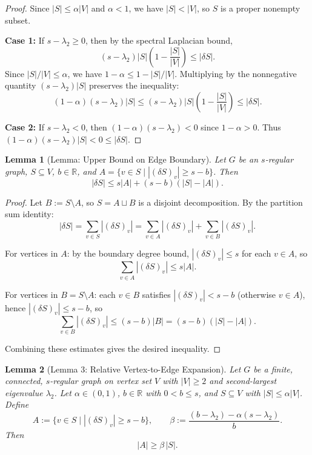\documentclass[11pt]{article}
\theoremstyle{plain}
\newtheorem*{lemma}{Lemma}
\theoremstyle{definition}
\theoremstyle{remark}
\begin{document}
\begin{proof}
Since $|S| \leq \alpha|V|$ and $\alpha < 1$, we have $|S| < |V|$, so $S$ is a proper nonempty subset.

\textbf{Case 1:} If $s - \lambda_2 \geq 0$, then by the spectral Laplacian bound,
\[
(s - \lambda_2)|S|\left(1 - \frac{|S|}{|V|}\right) \leq |\delta S|.
\]
Since $|S|/|V| \leq \alpha$, we have $1 - \alpha \leq 1 - |S|/|V|$. Multiplying by the nonnegative quantity $(s-\lambda_2)|S|$ preserves the inequality:
\[
(1-\alpha)(s-\lambda_2)|S| \leq (s-\lambda_2)|S|\left(1-\frac{|S|}{|V|}\right) \leq |\delta S|.
\]

\textbf{Case 2:} If $s - \lambda_2 < 0$, then $(1-\alpha)(s-\lambda_2) < 0$ since $1-\alpha > 0$. Thus $(1-\alpha)(s-\lambda_2)|S| < 0 \leq |\delta S|$.
\end{proof}

\begin{lemma}[Lemma: Upper Bound on Edge Boundary]
Let $G$ be an $s$-regular graph, $S \subseteq V$, $b \in \mathbb{R}$, and $A = \{v \in S \mid |(\delta S)_v| \geq s - b\}$. Then
\[
|\delta S| \leq s|A| + (s - b)(|S| - |A|).
\]
\end{lemma}

\begin{proof}
Let $B := S \setminus A$, so $S = A \sqcup B$ is a disjoint decomposition. By the partition sum identity:
\[
|\delta S| = \sum_{v \in S} |(\delta S)_v| = \sum_{v \in A} |(\delta S)_v| + \sum_{v \in B} |(\delta S)_v|.
\]

For vertices in $A$: by the boundary degree bound, $|(\delta S)_v| \leq s$ for each $v \in A$, so
\[
\sum_{v \in A} |(\delta S)_v| \leq s|A|.
\]

For vertices in $B = S \setminus A$: each $v \in B$ satisfies $|(\delta S)_v| < s - b$ (otherwise $v \in A$), hence $|(\delta S)_v| \leq s - b$, so
\[
\sum_{v \in B} |(\delta S)_v| \leq (s-b)|B| = (s-b)(|S| - |A|).
\]

Combining these estimates gives the desired inequality.
\end{proof}

\begin{lemma}[Lemma 3: Relative Vertex-to-Edge Expansion]
Let $G$ be a finite, connected, $s$-regular graph on vertex set $V$ with $|V| \geq 2$ and second-largest eigenvalue $\lambda_2$. Let $\alpha \in (0,1)$, $b \in \mathbb{R}$ with $0 < b \leq s$, and $S \subseteq V$ with $|S| \leq \alpha|V|$. Define
\[
A := \bigl\{ v \in S \;\big|\; |(\delta S)_v| \geq s - b \bigr\},
\qquad
\beta := \frac{(b - \lambda_2) - \alpha(s - \lambda_2)}{b}.
\]
Then
\[
|A| \geq \beta \, |S|.
\]
\end{lemma}
\end{document}
